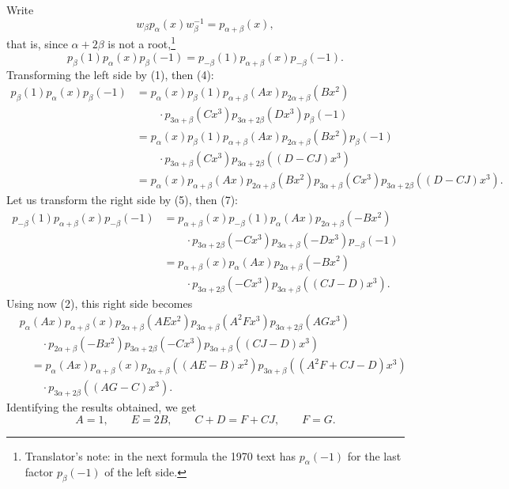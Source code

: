Write
\[
  w_\beta p_\alpha(x)w_\beta^{-1}=p_{\alpha+\beta}(x),
\]
that is, since \(\alpha+2\beta\) is not a root,\footnote{Translator's note: in the next formula
the 1970 text has \(p_\alpha(-1)\) for the last factor \(p_\beta(-1)\) of the left side.}
\[
  p_\beta(1)p_\alpha(x)p_\beta(-1)
   =p_{-\beta}(1)p_{\alpha+\beta}(x)p_{-\beta}(-1).
\]
Transforming the left side by (1), then (4):
\[
\begin{aligned}
 p_\beta(1)p_\alpha(x)p_\beta(-1)
 &=p_\alpha(x)p_\beta(1)p_{\alpha+\beta}(Ax)p_{2\alpha+\beta}(Bx^2)\\
 &\qquad{}\cdot p_{3\alpha+\beta}(Cx^3)p_{3\alpha+2\beta}(Dx^3)p_\beta(-1)\\
 &=p_\alpha(x)p_\beta(1)p_{\alpha+\beta}(Ax)p_{2\alpha+\beta}(Bx^2)p_\beta(-1)\\
 &\qquad{}\cdot p_{3\alpha+\beta}(Cx^3)p_{3\alpha+2\beta}((D-CJ)x^3)\\
 &=p_\alpha(x)p_{\alpha+\beta}(Ax)p_{2\alpha+\beta}(Bx^2)
   p_{3\alpha+\beta}(Cx^3)p_{3\alpha+2\beta}((D-CJ)x^3).
\end{aligned}
\]
Let us transform the right side by (5), then (7):
\[
\begin{aligned}
 p_{-\beta}(1)p_{\alpha+\beta}(x)p_{-\beta}(-1)
 &=p_{\alpha+\beta}(x)p_{-\beta}(1)p_\alpha(Ax)p_{2\alpha+\beta}(-Bx^2)\\
 &\qquad{}\cdot p_{3\alpha+2\beta}(-Cx^3)p_{3\alpha+\beta}(-Dx^3)p_{-\beta}(-1)\\
 &=p_{\alpha+\beta}(x)p_\alpha(Ax)p_{2\alpha+\beta}(-Bx^2)\\
 &\qquad{}\cdot p_{3\alpha+2\beta}(-Cx^3)p_{3\alpha+\beta}((CJ-D)x^3).
\end{aligned}
\]
Using now (2), this right side becomes
\[
\begin{aligned}
 &p_\alpha(Ax)p_{\alpha+\beta}(x)p_{2\alpha+\beta}(AEx^2)
   p_{3\alpha+\beta}(A^2Fx^3)p_{3\alpha+2\beta}(AGx^3)\\
 &\qquad{}\cdot p_{2\alpha+\beta}(-Bx^2)p_{3\alpha+2\beta}(-Cx^3)
   p_{3\alpha+\beta}((CJ-D)x^3)\\
 &\quad=p_\alpha(Ax)p_{\alpha+\beta}(x)p_{2\alpha+\beta}((AE-B)x^2)
   p_{3\alpha+\beta}((A^2F+CJ-D)x^3)\\
 &\qquad{}\cdot p_{3\alpha+2\beta}((AG-C)x^3).
\end{aligned}
\]
Identifying the results obtained, we get
\[
  A=1,\qquad E=2B,\qquad C+D=F+CJ,\qquad F=G.
\]

